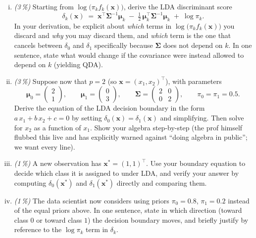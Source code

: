 \documentclass[11pt,a4paper]{article}
\newcommand{\subpoints}[1]{\textit{(#1\,\%)}}
\begin{document}
\begin{enumerate}[(i)]
  \item \subpoints{3} Starting from $\log\!\bigl(\pi_k f_k(\mathbf x)\bigr)$, derive the LDA discriminant score
  $$\boxed{\;\delta_k(\mathbf x) \;=\; \mathbf x^\top \boldsymbol\Sigma^{-1} \boldsymbol\mu_k \;-\; \tfrac{1}{2}\,\boldsymbol\mu_k^\top \boldsymbol\Sigma^{-1} \boldsymbol\mu_k \;+\; \log \pi_k.\;}$$
  In your derivation, be explicit about \emph{which} terms in $\log\!\bigl(\pi_k f_k(\mathbf x)\bigr)$ you discard and \emph{why} you may discard them, and \emph{which} term is the one that cancels between $\delta_0$ and $\delta_1$ specifically because $\boldsymbol\Sigma$ does not depend on $k$. In one sentence, state what would change if the covariance were instead allowed to depend on $k$ (yielding QDA).

  \item \subpoints{3} Suppose now that $p = 2$ (so $\mathbf x = (x_1, x_2)^\top$), with parameters
  $$\boldsymbol\mu_0 = \begin{pmatrix} 2 \\ 1 \end{pmatrix}, \qquad \boldsymbol\mu_1 = \begin{pmatrix} 0 \\ 3 \end{pmatrix}, \qquad \boldsymbol\Sigma = \begin{pmatrix} 2 & 0 \\ 0 & 2 \end{pmatrix}, \qquad \pi_0 = \pi_1 = 0.5.$$
  Derive the equation of the LDA decision boundary in the form $a\,x_1 + b\,x_2 + c = 0$ by setting $\delta_0(\mathbf x) = \delta_1(\mathbf x)$ and simplifying. Then solve for $x_2$ as a function of $x_1$. Show your algebra step-by-step (the prof himself flubbed this live and has explicitly warned against ``doing algebra in public''; we want every line).

  \item \subpoints{1} A new observation has $\mathbf x^* = (1, 1)^\top$. Use your boundary equation to decide which class it is assigned to under LDA, and verify your answer by computing $\delta_0(\mathbf x^*)$ and $\delta_1(\mathbf x^*)$ directly and comparing them.

  \item \subpoints{1} The data scientist now considers using priors $\pi_0 = 0.8$, $\pi_1 = 0.2$ instead of the equal priors above. In one sentence, state in which direction (toward class $0$ or toward class $1$) the decision boundary moves, and briefly justify by reference to the $\log \pi_k$ term in $\delta_k$.
\end{enumerate}
\end{document}
